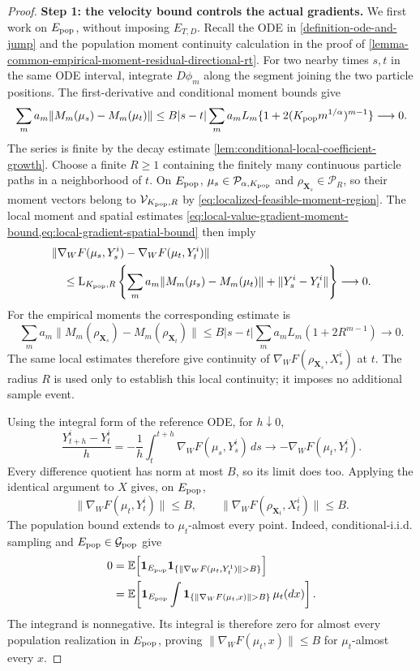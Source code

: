\begin{proof}
\noindent\textbf{Step 1: the velocity bound controls the actual gradients.}
We first work on $E_{\rm pop}$, without imposing $E_{T,D}$.
Recall the ODE in \cref{definition-ode-and-jump} and the population
moment continuity calculation in the proof of
\cref{lemma-common-empirical-moment-residual-directional-rt}.
For two nearby times $s,t$ in the same ODE interval, integrate
$D\phi_m$ along the segment joining the two particle positions.
The first-derivative and conditional moment bounds give
\[
 \sum_m a_m\|M_m(\mu_s)-M_m(\mu_t)\|
 \le B|s-t|\sum_m a_mL_m
       \{1+2(K_{\rm pop}m^{1/\alpha})^{m-1}\}
 \longrightarrow0.
\]
The series is finite by the decay estimate
\cref{lem:conditional-local-coefficient-growth}.
Choose a finite $R\ge1$ containing the finitely many continuous particle
paths in a neighborhood of $t$. On $E_{\rm pop}$,
$\mu_s\in\mathcal P_{\alpha,K_{\rm pop}}$ and
$\rho_{\mathbf X_s}\in\mathcal P_R$, so their moment vectors belong to
$\mathcal V_{K_{\rm pop},R}$ by \cref{eq:localized-feasible-moment-region}.
The local moment and spatial estimates
\cref{eq:local-value-gradient-moment-bound,eq:local-gradient-spatial-bound}
then imply
\begin{align*}
 &\|\nabla_WF(\mu_s,Y_s^i)-\nabla_WF(\mu_t,Y_t^i)\|\\
 &\quad\le \mathrm L_{K_{\rm pop},R}
 \left\{\sum_m a_m\|M_m(\mu_s)-M_m(\mu_t)\|
                      +\|Y_s^i-Y_t^i\|\right\}\longrightarrow0.
\end{align*}
For the empirical moments the corresponding estimate is
\[
 \sum_m a_m\|M_m(\rho_{\mathbf X_s})-M_m(\rho_{\mathbf X_t})\|
 \le B|s-t|\sum_m a_mL_m(1+2R^{m-1})\longrightarrow0.
\]
The same local estimates therefore give continuity of
$\nabla_WF(\rho_{\mathbf X_s},X_s^i)$ at $t$.
The radius $R$ is used only to establish this local continuity; it
imposes no additional sample event.

Using the integral form of the reference ODE, for $h\downarrow0$,
\[
 \frac{Y_{t+h}^i-Y_t^i}{h}
 =-\frac1h\int_t^{t+h}\nabla_WF(\mu_s,Y_s^i)\,ds
 \longrightarrow-\nabla_WF(\mu_t,Y_t^i).
\]
Every difference quotient has norm at most $B$, so its limit does too.
Applying the identical argument to $X$ gives, on $E_{\rm pop}$,
\[
 \|\nabla_WF(\mu_t,Y_t^i)\|\le B,\qquad
 \|\nabla_WF(\rho_{\mathbf X_t},X_t^i)\|\le B.
\]
The population bound extends to $\mu_t$-almost every point. Indeed,
conditional-i.i.d. sampling and $E_{\rm pop}\in\mathcal G_{\rm pop}$ give
\begin{align*}
 0
 &=\mathbb E\!\left[\mathbf1_{E_{\rm pop}}
   \mathbf1_{\{\|\nabla_WF(\mu_t,Y_t^1)\|>B\}}\right]\\
 &=\mathbb E\!\left[\mathbf1_{E_{\rm pop}}
   \int\mathbf1_{\{\|\nabla_WF(\mu_t,x)\|>B\}}\,\mu_t(dx)\right].
\end{align*}
The integrand is nonnegative. Its integral is therefore zero for almost
every population realization in $E_{\rm pop}$, proving
$\|\nabla_WF(\mu_t,x)\|\le B$ for $\mu_t$-almost every $x$.


\end{proof}
